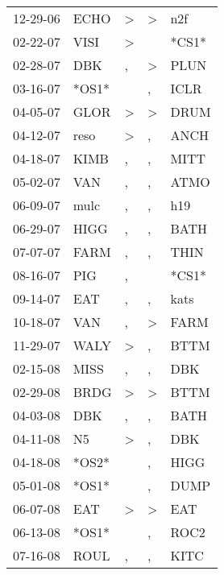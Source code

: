 \begin{supertabular}{lllll}
 12-29-06 &   ECHO &     \textgreater &     \textgreater &    n2f \\
 02-22-07 &   VISI &     \textgreater &                  &  *CS1* \\
 02-28-07 &    DBK &                , &     \textgreater &   PLUN \\
 03-16-07 &  *OS1* &                  &                , &   ICLR \\
 04-05-07 &   GLOR &     \textgreater &     \textgreater &   DRUM \\
 04-12-07 &   reso &     \textgreater &                , &   ANCH \\
 04-18-07 &   KIMB &                , &                , &   MITT \\
 05-02-07 &    VAN &                , &                , &   ATMO \\
 06-09-07 &   mulc &                , &                , &    h19 \\
 06-29-07 &   HIGG &                , &                , &   BATH \\
 07-07-07 &   FARM &                , &                , &   THIN \\
 08-16-07 &    PIG &                , &                  &  *CS1* \\
 09-14-07 &    EAT &                , &                , &   kats \\
 10-18-07 &    VAN &                , &     \textgreater &   FARM \\
 11-29-07 &   WALY &     \textgreater &                , &   BTTM \\
 02-15-08 &   MISS &                , &                , &    DBK \\
 02-29-08 &   BRDG &     \textgreater &     \textgreater &   BTTM \\
 04-03-08 &    DBK &                , &                , &   BATH \\
 04-11-08 &     N5 &     \textgreater &                , &    DBK \\
 04-18-08 &  *OS2* &                  &                , &   HIGG \\
 05-01-08 &  *OS1* &                  &                , &   DUMP \\
 06-07-08 &    EAT &     \textgreater &     \textgreater &    EAT \\
 06-13-08 &  *OS1* &                  &                , &   ROC2 \\
 07-16-08 &   ROUL &                , &                , &   KITC \\

\end{supertabular}
